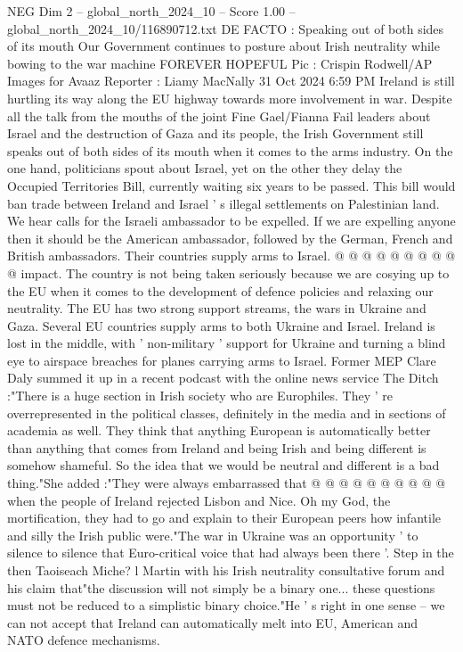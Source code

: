 \begin{textsample}{NEG Dim 2 – global\_north\_2024\_10 – Score 1.00 – global\_north\_2024\_10/116890712.txt}  \label{ex:f2_neg_369}
DE FACTO : Speaking out of both sides of its mouth Our Government continues to posture about Irish neutrality while bowing to the war machine FOREVER HOPEFUL Pic : Crispin Rodwell/AP Images for Avaaz Reporter : Liamy MacNally 31 Oct 2024 6:59 PM Ireland is still hurtling its way along the EU highway towards more involvement in war.
Despite all the talk from the mouths of the joint Fine Gael/Fianna Fail leaders about Israel and the destruction of Gaza and its people, the Irish Government still speaks out of both sides of its mouth when it comes to the arms industry.
On the one hand, politicians spout about Israel, yet on the other they delay the Occupied Territories Bill, currently waiting six years to be passed.
This bill would ban trade between Ireland and Israel ' s illegal settlements on Palestinian land.
We hear calls for the Israeli ambassador to be expelled.
If we are expelling anyone then it should be the American ambassador, followed by the German, French and British ambassadors.
Their countries supply arms to Israel. @ @ @ @ @ @ @ @ @ @ impact.
The country is not being taken seriously because we are cosying up to the EU when it comes to the development of defence policies and relaxing our neutrality.
The EU has two strong support streams, the wars in Ukraine and Gaza.
Several EU countries supply arms to both Ukraine and Israel.
Ireland is lost in the middle, with ' non-military ' support for Ukraine and turning a blind eye to airspace breaches for planes carrying arms to Israel.
Former MEP Clare Daly summed it up in a recent podcast with the online news service The Ditch :"There is a huge section in Irish society who are Europhiles.
They ' re overrepresented in the political classes, definitely in the media and in sections of academia as well.
They think that anything European is automatically better than anything that comes from Ireland and being Irish and being different is somehow shameful.
So the idea that we would be neutral and different is a bad thing."She added :"They were always embarrassed that @ @ @ @ @ @ @ @ @ @ when the people of Ireland rejected Lisbon and Nice.
Oh my God, the mortification, they had to go and explain to their European peers how infantile and silly the Irish public were."The war in Ukraine was an opportunity ' to silence to silence that Euro-critical voice that had always been there '.
Step in the then Taoiseach Miche? l Martin with his Irish neutrality consultative forum and his claim that"the discussion will not simply be a binary one... these questions must not be reduced to a simplistic binary choice."He ' s right in one sense -- we can not accept that Ireland can automatically melt into EU, American and NATO defence mechanisms.

\end{textsample}
